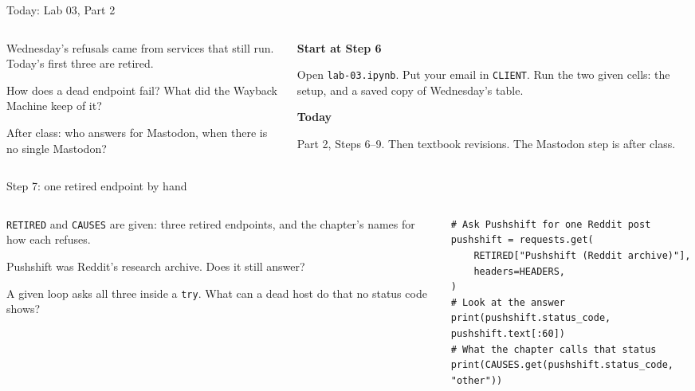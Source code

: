 \documentclass[9pt,aspectratio=169]{beamer}
\begin{document}
\begin{frame}{Today: Lab 03, Part 2}
    \begin{columns}[T]
        \begin{column}{0.6\textwidth}
            Wednesday's refusals came from services that still run. Today's first three are retired.

            \medskip
            How does a dead endpoint fail? What did the Wayback Machine keep of it?

            \medskip
            After class: who answers for Mastodon, when there is no single Mastodon?
        \end{column}
        \begin{column}{0.35\textwidth}
            \textbf{Start at Step 6}\\[2pt]
            {\footnotesize Open \texttt{lab-03.ipynb}. Put your email in \texttt{CLIENT}. Run the two given cells: the setup, and a saved copy of Wednesday's table.\par}
            \medskip
            \textbf{Today}\\[2pt]
            {\footnotesize Part 2, Steps 6--9. Then textbook revisions. The Mastodon step is after class.\par}
        \end{column}
    \end{columns}
\end{frame}

\begin{frame}[fragile]{Step 7: one retired endpoint by hand}
    \begin{columns}[T]
        \begin{column}{0.37\textwidth}
            \texttt{RETIRED} and \texttt{CAUSES} are given: three retired endpoints, and the chapter's names for how each refuses.

            \medskip
            Pushshift was Reddit's research archive. Does it still answer?

            \medskip
            A given loop asks all three inside a \texttt{try}. What can a dead host do that no status code shows?
        \end{column}
        \begin{column}{0.6\textwidth}
\begin{lstlisting}[basicstyle=\ttfamily\footnotesize]
# Ask Pushshift for one Reddit post
pushshift = requests.get(
    RETIRED["Pushshift (Reddit archive)"],
    headers=HEADERS,
)
# Look at the answer
print(pushshift.status_code, pushshift.text[:60])
# What the chapter calls that status
print(CAUSES.get(pushshift.status_code, "other"))
\end{lstlisting}
        \end{column}
    \end{columns}
\end{frame}
\end{document}
